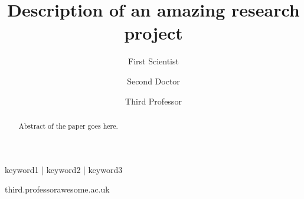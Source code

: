 \title{Description of an amazing research project}

\author[1]{First Scientist }
\author[2]{Second Doctor }
\author[1,\Letter]{Third Professor }
\date{}


\maketitle

\begin{abstract}
Abstract of the paper goes here.
\lipsum[1]
\end{abstract}

\begin{keywords}
keyword1 | keyword2 | keyword3
\end{keywords}

\begin{corrauthor}
third.professor\at awesome.ac.uk
\end{corrauthor}
